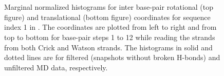 \begin{figure}
\begin{center}
\\
 \\
\end{center}
\caption{Marginal normalized histograms for inter base-pair rotational (top figure) and translational (bottom figure) coordinates for sequence index 1 in \Lbdna.
The coordinates are plotted from left to right and from top to bottom for base-pair steps 1 to 12 while reading the strands from both Crick and Watson strands.  
The histograms in solid and dotted lines are for filtered (snapshots without broken H-bonds) and unfiltered MD data, respectively.
}
\label{c3:fig_hist_filter2}
\end{figure} \clearpage

